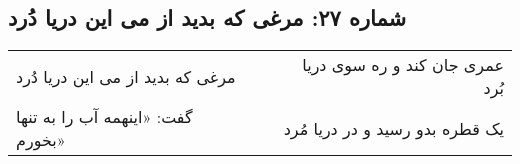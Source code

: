 \begin{center}
\section*{شماره ۲۷: مرغی که بدید از می این دریا دُرد}
\label{sec:027}
\begin{longtable}{l p{0.5cm} r}
مرغی که بدید از می این دریا دُرد
&&
عمری جان کند و ره سوی دریا بُرد
\\
گفت: «اینهمه آب را به تنها بخورم»
&&
یک قطره بدو رسید و در دریا مُرد
\\
\end{longtable}
\end{center}
